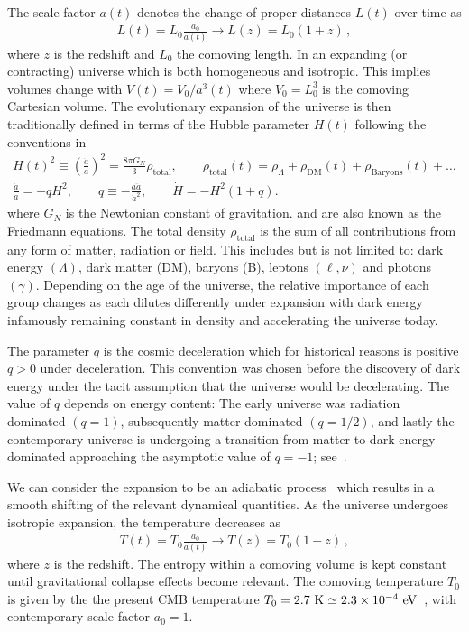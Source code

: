 The scale factor $a(t)$ denotes the change of proper distances $L(t)$ over time as
\begin{gather}
 L(t)=L_{0}\frac{a_{0}}{a(t)}\rightarrow L(z)=L_{0}(1+z)\,,
\end{gather}
where $z$ is the redshift and $L_{0}$ the comoving length. In an expanding (or contracting) universe which is both homogeneous and isotropic. This implies volumes change with $V(t)=V_{0}/a^{3}(t)$ where $V_{0}=L_{0}^{3}$ is the comoving Cartesian volume. The evolutionary expansion of the universe is then traditionally defined in terms of the Hubble parameter $H(t)$ following the conventions in~\cite{weinberg1972gravitation}
\begin{gather}
 \label{Friedmann:1} H(t)^{2}\equiv\left(\frac{\dot a}{a}\right)^2=\frac{8\pi G_{N}}{3}\rho_\mathrm{total},\qquad \rho_\mathrm{total}(t)=\rho_{\Lambda}+\rho_\mathrm{DM}(t)+\rho_\mathrm{Baryons}(t)+\ldots\\
 \label{Friedmann:2}
 \frac{\ddot a}{a}=-qH^2,\qquad 
q\equiv -\frac{a\ddot a}{\dot a^2},\qquad \dot H=-H^2(1+q).
\end{gather}
where $G_N$ is the Newtonian constant of gravitation.  and  are also known as the Friedmann equations. The total density $\rho_\mathrm{total}$ is the sum of all contributions from any form of matter, radiation or field. This includes but is not limited to: dark energy $(\Lambda)$, dark matter (DM), baryons (B), leptons $(\ell,\nu)$ and photons $(\gamma)$. Depending on the age of the universe, the relative importance of each group changes as each dilutes differently under expansion with dark energy infamously remaining constant in density and accelerating the universe today.

The parameter $q$ is the cosmic deceleration which for historical reasons is positive $q>0$ under deceleration. This convention was chosen before the discovery of dark energy under the tacit assumption that the universe would be decelerating. The value of $q$ depends on energy content: The early universe was radiation dominated $(q = 1)$, subsequently matter dominated $(q = 1/2)$, and lastly the contemporary universe is undergoing a transition from matter to dark energy dominated approaching the asymptotic value of $q = -1$; see~\cite{Rafelski:2013yka}.

We can consider the expansion to be an adiabatic process~\cite{Abdalla:2022yfr} which results in a smooth shifting of the relevant dynamical quantities. As the universe undergoes isotropic expansion, the temperature decreases as 
\begin{gather}
 \label{tscale}
 T(t)=T_{0}\frac{a_{0}}{a(t)}\rightarrow T(z)=T_{0}(1+z)\,,
\end{gather}
where $z$ is the redshift. The entropy within a comoving volume is kept constant until gravitational collapse effects become relevant. The comoving temperature $T_{0}$ is given by the the present CMB temperature $T_{0}=2.7{\rm\ K}\simeq2.3\times10^{-4}\eV$~\cite{Planck:2018vyg}, with contemporary scale factor $a_{0}=1$.

